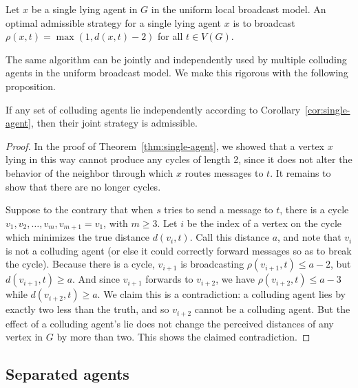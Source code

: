 \documentclass{comnet}
\begin{document}
\begin{corollary} \label{cor:single-agent}

Let $x$ be a single lying agent in $G$ in the uniform local broadcast model. An
optimal admissible strategy for a single lying agent $x$ is to broadcast
$\rho(x,t) = \max(1, d(x,t) - 2)$ for all $t \in V(G)$.

\end{corollary}

The same algorithm can be jointly and independently used by multiple colluding
agents in the uniform broadcast model. We make this rigorous with the following
proposition.

\begin{proposition} \label{prop:independent-agents}

If any set of colluding agents lie independently according to
Corollary~\ref{cor:single-agent}, then their joint strategy is admissible.

\end{proposition}

\begin{proof}

In the proof of Theorem~\ref{thm:single-agent}, we showed that a vertex $x$
lying in this way cannot produce any cycles of length 2, since it does not
alter the behavior of the neighbor through which $x$ routes messages to $t$. It
remains to show that there are no longer cycles.

Suppose to the contrary that when $s$ tries to send a message to $t$, there is
a cycle $v_1, v_2, \dots, v_m, v_{m+1} = v_1$, with $m \geq 3$. Let $i$ be the
index of a vertex on the cycle which minimizes the true distance $d(v_i, t)$.
Call this distance $a$, and note that $v_i$ is not a colluding agent (or else
it could correctly forward messages so as to break the cycle). Because there is
a cycle, $v_{i+1}$ is broadcasting $\rho(v_{i+1}, t) \leq a-2$, but $d(v_{i+1},
t) \geq a$. And since $v_{i+1}$ forwards to $v_{i+2}$, we have $\rho(v_{i+2},
t) \leq a-3$ while $d(v_{i+2}, t) \geq a$. We claim this is a contradiction: a
colluding agent lies by exactly two less than the truth, and so $v_{i+2}$
cannot be a colluding agent. But the effect of a colluding agent's lie does not
change the perceived distances of any vertex in $G$ by more than two. This
shows the claimed contradiction.
\end{proof}

\subsection{Separated agents}\label{sec:separated}
\end{document}
